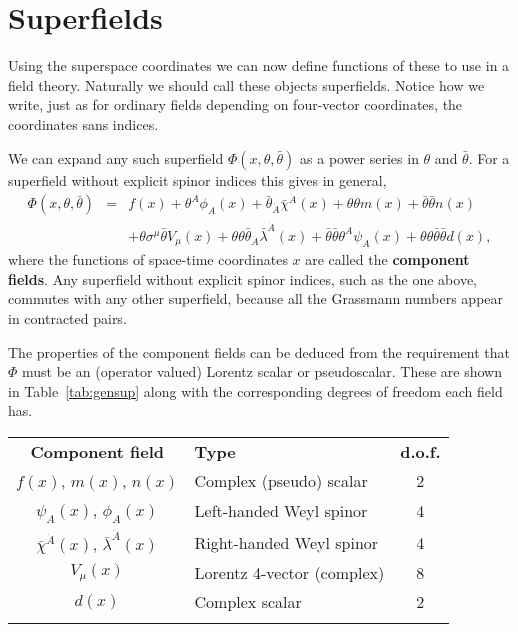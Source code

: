 \documentclass[notes.tex]{subfiles}
\begin{document}
\section{Superfields}
Using the superspace coordinates we can now define functions of these to use in a field theory. Naturally we should call these objects superfields.
Notice how we write, just as for ordinary fields depending on four-vector coordinates, the coordinates sans indices. 

We can expand any such superfield $\Phi(x, \theta, \bar{\theta})$  as a power series in $\theta$ and $\bar{\theta}$. For a superfield without explicit spinor indices this gives in general,
\begin{eqnarray}
\Phi(x, \theta, \bar{\theta}) &=& f(x) + \theta^A\phi_A(x) + \bar{\theta}_{\dot{A}}\bar{\chi}^{\dot{A}}(x) + \theta\theta m(x) + \bar{\theta}\bar{\theta}n(x) \nonumber\\ 
&& + \theta \sigma^\mu \bar{\theta}V_\mu(x) + \theta \theta \bar{\theta}_{\dot{A}}\bar{\lambda}^{\dot{A}}(x) +\bar{\theta}\bar{\theta}\theta^A\psi_A(x) + \theta\theta\bar{\theta}\bar{\theta}d(x),\label{eq:gen_sup}
\end{eqnarray} 
where the functions of space-time coordinates $x$ are called the {\bf component fields}. Any superfield without explicit spinor indices, such as the one above, commutes with any other superfield, because all the Grassmann numbers appear in contracted pairs. 

The properties of the component fields can be deduced from the requirement that $\Phi$ must be an (operator valued) Lorentz scalar or pseudoscalar. These are shown in Table~\ref{tab:gensup} along with the corresponding degrees of freedom each field has.
\begin{center}
   \begin{tabular}{c |l| c} 
   \noalign{\smallskip}\hline\noalign{\smallskip}
   {\bf Component field} & {\bf Type} & {\bf d.o.f.} \\
   \noalign{\smallskip}\hline\noalign{\smallskip}
   $f(x)$, $m(x)$, $n(x)$ & Complex (pseudo) scalar & 2\\
   $\psi_A(x)$, $\phi_A(x)$ & Left-handed Weyl spinor & 4\\
   $\bar{\chi}^{\dot{A}}(x)$, $\bar{\lambda}^{\dot{A}}(x)$ &Right-handed Weyl spinor& 4\\
   $V_\mu(x)$ & Lorentz 4-vector (complex) & 8\\
   $d(x)$ & Complex scalar & 2 \\
   \noalign{\smallskip}\hline\noalign{\smallskip}
    \end{tabular}
   \end{center}
\end{document}
